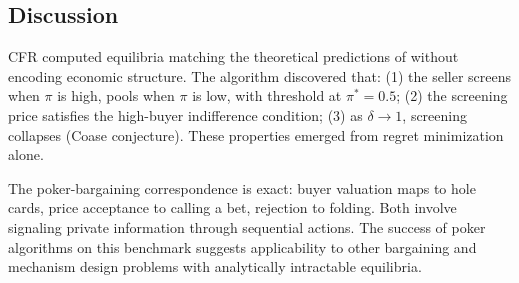 \subsection{Discussion}

CFR computed equilibria matching the theoretical predictions of \citet{gul1986foundations} without encoding economic structure. The algorithm discovered that: (1) the seller screens when $\pi$ is high, pools when $\pi$ is low, with threshold at $\pi^* = 0.5$; (2) the screening price satisfies the high-buyer indifference condition; (3) as $\delta \to 1$, screening collapses (Coase conjecture). These properties emerged from regret minimization alone.

The poker-bargaining correspondence is exact: buyer valuation maps to hole cards, price acceptance to calling a bet, rejection to folding. Both involve signaling private information through sequential actions. The success of poker algorithms on this benchmark suggests applicability to other bargaining and mechanism design problems with analytically intractable equilibria.
